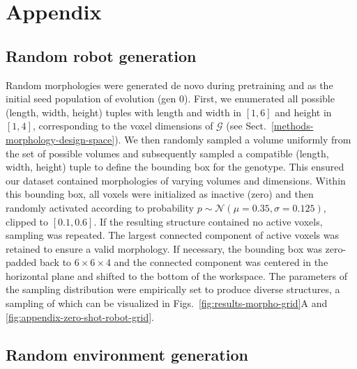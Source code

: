 \clearpage
\appendix
\onecolumn
\section{Appendix}


\subsection{Random robot generation}
\label{appendix-dataset-random-robot-generation}

Random morphologies were generated de novo during pretraining and as the initial seed population of evolution (gen 0). 
First, we enumerated all possible (length, width, height) tuples with length and width in $[1, 6]$ and height in $[1, 4]$, corresponding to the voxel dimensions of $\mathcal{G}$ (see Sect.~\ref{methods-morphology-design-space}). 
We then randomly sampled a volume uniformly from the set of possible volumes and subsequently sampled a compatible (length, width, height) tuple to define the bounding box for the genotype. 
This ensured our dataset contained morphologies of varying volumes and dimensions. 
Within this bounding box, all voxels were initialized as inactive (zero) and then randomly activated according to probability $p \sim \mathcal{N}(\mu=0.35, \sigma=0.125)$, clipped to $[0.1, 0.6]$.  
If the resulting structure contained no active voxels, sampling was repeated. The largest connected component of active voxels was retained to ensure a valid morphology. 
If necessary, the bounding box was zero-padded back to $6 \times 6 \times 4$ and the connected component was centered in the horizontal plane and shifted to the bottom of the workspace. 
The parameters of the sampling distribution were empirically set to produce diverse structures, a sampling of which can be visualized in Figs.~\ref{fig:results-morpho-grid}A
and 
\ref{fig:appendix-zero-shot-robot-grid}. 



\subsection{Random environment generation}
\label{appendix-dataset-random-environment-generation}

